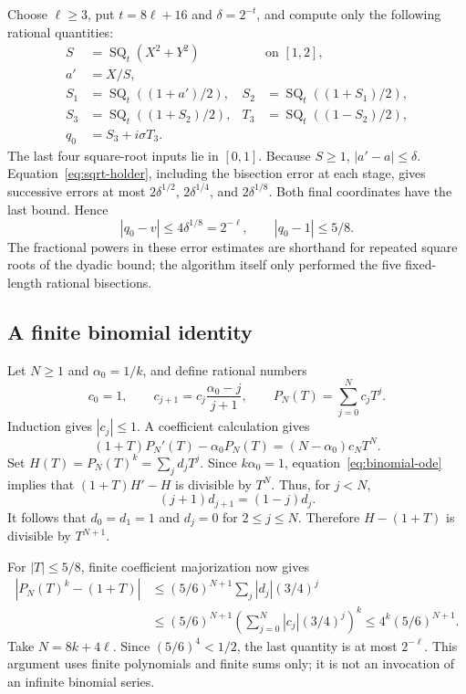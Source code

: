 \documentclass[11pt,letterpaper]{article}
\theoremstyle{definition}\newtheorem{definition}[theorem]{Definition}
\theoremstyle{remark}\newtheorem{remark}[theorem]{Remark}
\begin{document}
Choose $\ell\ge3$, put $t=8\ell+16$ and $\delta=2^{-t}$, and compute
only the following rational quantities:
\begin{align*}
 S&=\operatorname{SQ}_t(X^2+Y^2) &&\text{on }[1,2],\\
 a'&=X/S,\\
 S_1&=\operatorname{SQ}_t((1+a')/2),&
 S_2&=\operatorname{SQ}_t((1+S_1)/2),\\
 S_3&=\operatorname{SQ}_t((1+S_2)/2),&
 T_3&=\operatorname{SQ}_t((1-S_2)/2),\\
 q_0&=S_3+i\sigma T_3.
\end{align*}
The last four square-root inputs lie in $[0,1]$. Because $S\ge1$,
$|a'-a|\le\delta$. Equation~\eqref{eq:sqrt-holder}, including the bisection
error at each stage, gives successive errors at most
$2\delta^{1/2}$, $2\delta^{1/4}$, and $2\delta^{1/8}$.
Both final coordinates have the last bound. Hence
\begin{equation}
 |q_0-v|\le4\delta^{1/8}=2^{-\ell},
 \qquad |q_0-1|\le5/8.
 \label{eq:q-close}
\end{equation}
The fractional powers in these error estimates are shorthand for repeated
square roots of the dyadic bound; the algorithm itself only performed the
five fixed-length rational bisections.

\subsection{A finite binomial identity}

Let $N\ge1$ and $\alpha_0=1/k$, and define rational numbers
\[
 c_0=1,\qquad c_{j+1}=c_j\frac{\alpha_0-j}{j+1},
 \qquad P_N(T)=\sum_{j=0}^N c_jT^j.
\]
Induction gives $|c_j|\le1$. A coefficient calculation gives
\begin{equation}
 (1+T)P_N'(T)-\alpha_0P_N(T)=(N-\alpha_0)c_NT^N.
 \label{eq:binomial-ode}
\end{equation}
Set $H(T)=P_N(T)^k=\sum_j d_jT^j$.
Since $k\alpha_0=1$, equation~\eqref{eq:binomial-ode} implies that
$(1+T)H'-H$ is divisible by $T^N$. Thus, for $j<N$,
\[
 (j+1)d_{j+1}=(1-j)d_j.
\]
It follows that $d_0=d_1=1$ and $d_j=0$ for $2\le j\le N$.
Therefore $H-(1+T)$ is divisible by $T^{N+1}$.

For $|T|\le5/8$, finite coefficient majorization now gives
\begin{align*}
 |P_N(T)^k-(1+T)|
 &\le (5/6)^{N+1}\sum_j|d_j|(3/4)^j\\
 &\le (5/6)^{N+1}
       \left(\sum_{j=0}^N|c_j|(3/4)^j\right)^k
 \le 4^k(5/6)^{N+1}.
\end{align*}
Take $N=8k+4\ell$. Since $(5/6)^4<1/2$, the last quantity is at most
$2^{-\ell}$. This argument uses finite polynomials and finite sums only;
it is not an invocation of an infinite binomial series.
\end{document}

